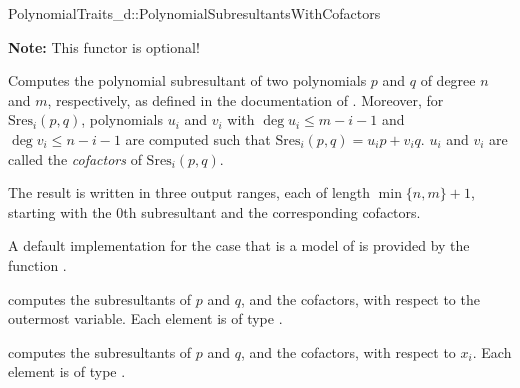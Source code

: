 \begin{ccRefConcept}{PolynomialTraits_d::PolynomialSubresultantsWithCofactors}

\textbf{Note:} This functor is optional!

\ccDefinition

Computes the polynomial subresultant of two polynomials $p$ and $q$ of degree
$n$ and $m$, respectively, 
as defined in the documentation of .
Moreover, for $\mathrm{Sres}_i(p,q)$, polynomials $u_i$ and $v_i$
with $\deg u_i\leq m-i-1$ and $\deg v_i\leq n-i-1$ are computed 
such that $\mathrm{Sres}_i(p,q)=u_i p + v_i q$. $u_i$ and $v_i$ are called
the \emph{cofactors} of $\mathrm{Sres}_i(p,q)$.
 
The result is written in three output ranges, each of length $\min\{n,m\}+1$, 
starting with the $0$th subresultant and the corresponding cofactors.

A default implementation for the case that 
is a model of 
is provided by the function .

\ccOperations
{}
         { computes the subresultants of $p$ and $q$, and the cofactors, 
           with respect to the outermost variable. Each element is of type
           .}

         { computes the subresultants of $p$ and $q$, and the cofactors, 
           with respect to $x_i$. Each element is of type
           .}


\ccSeeAlso

\\
\\
\\
\\

\end{ccRefConcept}
